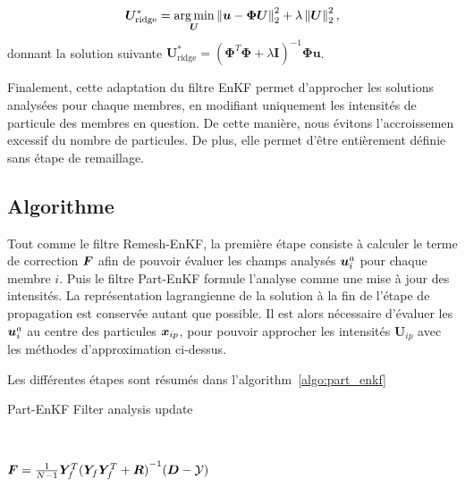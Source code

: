 \begin{equation*}
    \bm{U}_{\text{ridge}}^* = \operatorname*{arg\,min}_{\bm{U}} \left\lVert \bm{u} - \bm \Phi \bm{U} \right\rVert_2^2 + \lambda \left\lVert \bm{U} \right\rVert^2_2,
\end{equation*}donnant la solution suivante $\bm{U}^*_{\text{ridge}} = (\bm \Phi^T \bm \Phi + \lambda \bm I)^{-1} \bm \Phi \bm{u}$.

Finalement, cette adaptation du filtre EnKF permet d'approcher les solutions analysées pour chaque membres, en modifiant uniquement les intensités de particule des membres en question. De cette manière, nous évitons l'accroissemen excessif du nombre de particules. De plus, elle permet d'être entièrement définie sans étape de remaillage.

\subsection{Algorithme}

Tout comme le filtre Remesh-EnKF, la première étape consiste à calculer le terme de correction $\bm{F}$ afin de pouvoir évaluer les champs analysés $\bm{u}_i^a$ pour chaque membre $i$. Puis le filtre Part-EnKF formule l'analyse comme une mise à jour des intensités. La représentation lagrangienne de la solution à la fin de l'étape de propagation est conservée autant que possible. Il est alors nécessaire d'évaluer les $\bm{u}_i^a$ au centre des particules $\bm{x}_{ip}$, pour pouvoir approcher les intensités $\bm U_{ip}$ avec les méthodes d'approximation ci-dessus.

Les différentes étapes sont résumés dans l'algorithm~\ref{algo:part_enkf}
\begin{algorithm}
    \caption{Part-EnKF Filter analysis update}~\label{algo:part_enkf}

    $ \bm{F} = \frac{1}{N-1}\bm Y_f^T {(\bm Y_f \bm Y_f^T + \bm R)}^{-1}(\bm{D} - \mathcal{Y})$ 
\end{algorithm}

